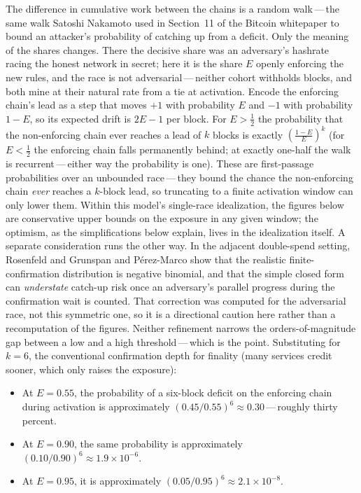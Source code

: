 \documentclass[11pt, twoside, openright]{book}
\begin{document}
The difference in cumulative work between the chains is a random walk\,---\,the same walk Satoshi Nakamoto used in Section~11 of the Bitcoin whitepaper to bound an attacker's probability of catching up from a deficit. Only the meaning of the shares changes. There the decisive share was an adversary's hashrate racing the honest network in secret; here it is the share $E$ openly enforcing the new rules, and the race is not adversarial\,---\,neither cohort withholds blocks, and both mine at their natural rate from a tie at activation. Encode the enforcing chain's lead as a step that moves $+1$ with probability $E$ and $-1$ with probability $1-E$, so its expected drift is $2E-1$ per block. For $E>\tfrac{1}{2}$ the probability that the non-enforcing chain ever reaches a lead of $k$ blocks is exactly $\left(\frac{1-E}{E}\right)^{k}$ (for $E<\tfrac{1}{2}$ the enforcing chain falls permanently behind; at exactly one-half the walk is recurrent\,---\,either way the probability is one). These are first-passage probabilities over an unbounded race\,---\,they bound the chance the non-enforcing chain \emph{ever} reaches a $k$-block lead, so truncating to a finite activation window can only lower them. Within this model's single-race idealization, the figures below are conservative upper bounds on the exposure in any given window; the optimism, as the simplifications below explain, lives in the idealization itself. A separate consideration runs the other way. In the adjacent double-spend setting, Rosenfeld and Grunspan and P\'erez-Marco show that the realistic finite-confirmation distribution is negative binomial, and that the simple closed form can \emph{understate} catch-up risk once an adversary's parallel progress during the confirmation wait is counted. That correction was computed for the adversarial race, not this symmetric one, so it is a directional caution here rather than a recomputation of the figures. Neither refinement narrows the orders-of-magnitude gap between a low and a high threshold\,---\,which is the point. Substituting for $k = 6$, the conventional confirmation depth for finality (many services credit sooner, which only raises the exposure):

\begin{itemize}
  \item At $E = 0.55$, the probability of a six-block deficit on the enforcing chain during activation is approximately $(0.45/0.55)^{6} \approx 0.30$\,---\,roughly thirty percent.
  \item At $E = 0.90$, the same probability is approximately $(0.10/0.90)^{6} \approx 1.9\times 10^{-6}$.
  \item At $E = 0.95$, it is approximately $(0.05/0.95)^{6} \approx 2.1\times 10^{-8}$.
\end{itemize}
\end{document}
